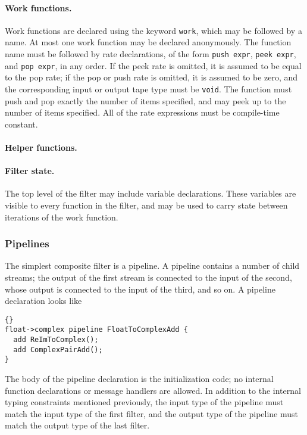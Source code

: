 \documentclass[11pt]{article}
\begin{document}
\paragraph{Work functions.}  Work functions are declared using the
keyword \lstinline|work|, which may be followed by a name.  At most
one work function may be declared anonymously.  The function name must
be followed by rate declarations, of the form \lstinline|push expr|,
\lstinline|peek expr|, and \lstinline|pop expr|, in any order.  If the
peek rate is omitted, it is assumed to be equal to the pop rate; if
the pop or push rate is omitted, it is assumed to be zero, and the
corresponding input or output tape type must be \lstinline|void|.  The
function must push and pop exactly the number of items specified, and
may peek up to the number of items specified.  All of the rate
expressions must be compile-time constant.

\paragraph{Helper functions.}

\paragraph{Filter state.}  The top level of the filter may include
variable declarations.  These variables are visible to every function
in the filter, and may be used to carry state between iterations of
the work function.


\subsubsection{Pipelines}

The simplest composite filter is a pipeline.  A pipeline contains a
number of child streams; the output of the first stream is connected
to the input of the second, whose output is connected to the input of
the third, and so on.  A pipeline declaration looks like

\begin{lstlisting}{}
float->complex pipeline FloatToComplexAdd {
  add ReImToComplex();
  add ComplexPairAdd();
}
\end{lstlisting}

The body of the pipeline declaration is the initialization code; no
internal function declarations or message handlers are allowed.  In
addition to the internal typing constraints mentioned previously, the
input type of the pipeline must match the input type of the first
filter, and the output type of the pipeline must match the output type
of the last filter.
\end{document}
